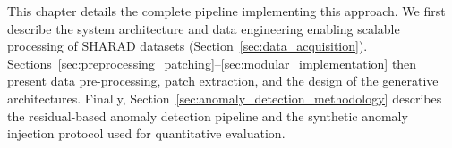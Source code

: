 This chapter details the complete pipeline implementing this approach.
We first describe the system architecture and data engineering enabling scalable processing of SHARAD datasets (Section~\ref{sec:data_acquisition}).
Sections~\ref{sec:preprocessing_patching}--\ref{sec:modular_implementation} then present data pre-processing, patch extraction, and the design of the generative architectures.
Finally, Section~\ref{sec:anomaly_detection_methodology} describes the residual-based anomaly detection pipeline and the synthetic anomaly injection protocol used for quantitative evaluation.












